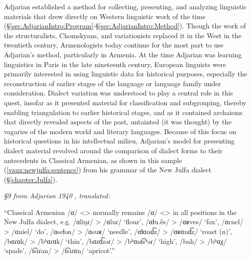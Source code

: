 \documentclass[output=paper]{langscibook}
\begin{document}
Adjarian established a method for collecting, presenting, and analyzing linguistic materials that drew directly on Western linguistic work of the time (\S\ref{sec:AdjarianIntro:Program}-\S\ref{sec:AdjarianIntro:Method}). Though the work of the structuralists, Chomskyans, and variationists replaced it in the West in the twentieth century, Armenologists today continue for the most part to use Adjarian's method, particularly in Armenia. At the time Adjarian was learning linguistics in Paris in the late nineteenth century, European linguists were primarily interested in using linguistic data for historical purposes, especially the reconstruction of earlier stages of the language or language family under consideration. Dialect variation was understood to play a central role in this quest, insofar as it presented material for classification and subgrouping, thereby enabling triangulation to earlier historical stages, and as it contained archaisms that directly revealed aspects of the past, untainted (it was thought) by the vagaries of the modern world and literary languages. Because of this focus on historical questions in his intellectual milieu, Adjarian's model for presenting dialect material revolved around the comparison of dialect forms to their antecedents in Classical Armenian, as shown in this sample (\ref{vaux:newjulfa:sentence}) from his grammar of the New Julfa dialect (\S\ref{chapter:Julfa}). 


\begin{exe}
    \ex \textit{\S9 from Adjarian 1940 \citep{Adjarian-1940-NewJulfaDialect}, translated:} \label{vaux:newjulfa:sentence}

    	``Classical Armenian /ɑ/ <>  normally remains /ɑ/ <>  in all positions in the New Julfa dialect, e.g.  /ɑliu̯ɾ/ > /ɑluɾ/ `flour',  /ɑɫu.\'ēs/ > /ɑʁves/ `fox',  /ɑrnel/ > /ɑniel/ `do',  /ɑseɫən/ > /ɑsuʁ/ `needle',  /ɑɫɑnd͡z/ > /ɑʁɑnd͡z/ `roast (n)',  /bɑɾɑk/ > /bʰɑɾɑk/ `thin',  /bɑɾd͡zəɾ/ > /bʰɑnt͡sʰəɾ/ `high',  /bah/ > /bʰɑχ/ `spade',  /t͡siɾan/ > /t͡siɾɑn/ `apricot'.''

\end{exe} 
\end{document}
